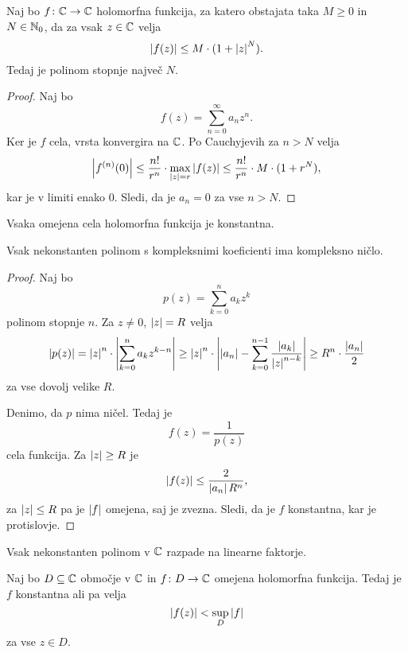 \begin{izrek}[Liouville]
Naj bo $f \colon \mathbb{C} \to \mathbb{C}$ holomorfna funkcija, za katero
obstajata taka $M \geq 0$ in $N \in \mathbb{N}_0$, da za vsak $z \in \mathbb{C}$
velja
\[
\left\lvert f(z)\right\rvert \leq M \cdot (1 + \left\lvert z\right\rvert^N).
\]
Tedaj je polinom stopnje največ $N$.
\end{izrek}

\begin{proof}
Naj bo
\[
f(z) = \sum_{n=0}^\infty a_n z^n.
\]
Ker je $f$ cela, vrsta konvergira na $\mathbb{C}$. Po Cauchyjevih za
$n > N$ velja
\[
\left\lvert f^{(n)}(0)\right\rvert \leq
\frac{n!}{r^n} \cdot \max_{\left\lvert z\right\rvert=r} \left\lvert f(z)\right\rvert \leq
\frac{n!}{r^n} \cdot M \cdot (1 + r^N),
\]
kar je v limiti enako $0$. Sledi, da je $a_n = 0$ za vse $n > N$.
\end{proof}

\begin{posledica}
Vsaka omejena cela holomorfna funkcija je konstantna.
\end{posledica}

\begin{izrek}
Vsak nekonstanten polinom s kompleksnimi koeficienti ima kompleksno
ničlo.
\end{izrek}

\begin{proof}
Naj bo
\[
p(z) = \sum_{k=0}^n a_k z^k
\]
polinom stopnje $n$. Za $z \ne 0$, $\left\lvert z\right\rvert = R$ velja
\[
\left\lvert p(z)\right\rvert = \left\lvert z\right\rvert^n \cdot \left\lvert  \sum_{k=0}^n a_k z^{k-n}\right\rvert \geq
\left\lvert z\right\rvert^n \cdot \left\lvert \left\lvert a_n\right\rvert -
\sum_{k=0}^{n-1} \frac{\left\lvert a_k\right\rvert}{\left\lvert z\right\rvert^{n-k}}\right\rvert \geq
R^n \cdot \frac{\left\lvert a_n\right\rvert}{2}
\]
za vse dovolj velike $R$.

Denimo, da $p$ nima ničel. Tedaj je
\[
f(z) = \frac{1}{p(z)}
\]
cela funkcija. Za $\left\lvert z\right\rvert \geq R$ je
\[
\left\lvert f(z)\right\rvert \leq \frac{2}{\left\lvert a_n\right\rvert R^n},
\]
za $\left\lvert z\right\rvert \leq R$ pa je $\left\lvert f\right\rvert$ omejena, saj je zvezna. Sledi,
da je $f$ konstantna, kar je protislovje.
\end{proof}

\begin{posledica}
Vsak nekonstanten polinom v $\mathbb{C}$ razpade na linearne faktorje.
\end{posledica}

\begin{trditev}
Naj bo $D \subseteq \mathbb{C}$ območje v $\mathbb{C}$ in $f \colon D \to \mathbb{C}$
omejena holomorfna funkcija. Tedaj je $f$ konstantna ali pa velja
\[
\left\lvert f(z)\right\rvert < \sup_D \left\lvert f\right\rvert
\]
za vse $z \in D$.
\end{trditev}

